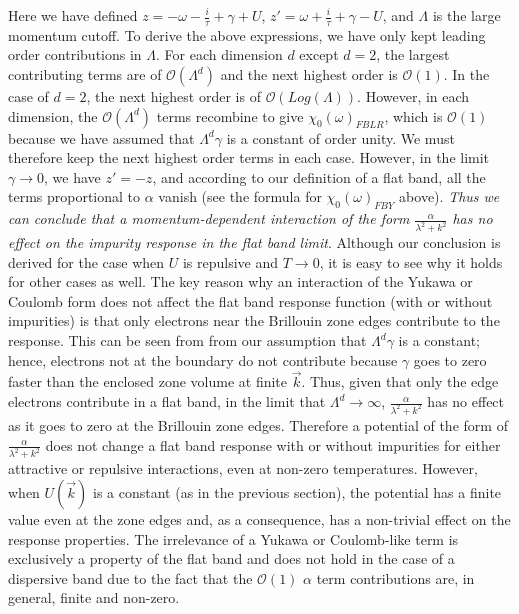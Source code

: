 \documentclass[prl,aps,twocolumn,groupaddress]{revtex4-1}
\begin{document}
Here we have defined $z = -\omega - \frac{i}{\tau} + \gamma + U$, $z' = \omega + \frac{i}{\tau} +\gamma - U$, and $\Lambda$ is the large momentum cutoff. To derive the above expressions, we have only kept leading order contributions in $\Lambda$. For each dimension $d$ except $d=2$, the largest contributing terms are of $\mathscr{O}(\Lambda^d)$ and the next highest order is $\mathscr{O}(1)$. In the case of $d=2$, the next highest order is of $\mathscr{O}(Log(\Lambda))$. However, in each dimension, the $\mathscr{O}(\Lambda^d)$ terms recombine to give $\chi_0(\omega)_{FBLR}$, which is $\mathscr{O}(1)$ because we have assumed that $\Lambda^d \gamma$ is a constant of order unity.  We must therefore keep the next highest order terms in each case. However, in the limit $\gamma \rightarrow 0$, we have $z' = -z$, and according to our definition of a flat band, all the terms proportional to $\alpha$ vanish (see the formula for $\chi_0(\omega)_{FBY}$ above). \textit{Thus we can conclude that a momentum-dependent interaction of the form $\frac{\alpha}{\lambda^2 + k^2}$ has no effect on the impurity response in the flat band limit}. Although our conclusion is derived for the case when $U$ is repulsive and $T\rightarrow0$, it is easy to see why it holds for other cases as well. The key reason why an interaction of the Yukawa or Coulomb form does not affect the flat band response function (with or without impurities) is that only electrons near the Brillouin zone edges contribute to the response. This can be seen from from our assumption that $\Lambda^d \gamma$ is a constant; hence, electrons not at the boundary do not contribute because $\gamma$ goes to zero faster than the enclosed zone volume at finite $\vec k$. Thus, given that only the edge electrons contribute in a flat band, in the limit that $\Lambda^d\rightarrow \infty$, $\frac{\alpha}{\lambda^2 + k^2}$ has no effect as it goes to zero at the Brillouin zone edges. Therefore a potential of the form of $\frac{\alpha}{\lambda^2 + k^2}$ does not change a flat band response with or without impurities for either attractive or repulsive interactions, even at non-zero temperatures. However, when $U(\vec k)$ is a constant (as in the previous section), the potential has a finite value even at the zone edges and, as a consequence, has a non-trivial effect on the response properties.  The irrelevance of a Yukawa or Coulomb-like term is exclusively a property of the flat band and does not hold in the case of a dispersive band due to the fact that the $\mathscr{O}(1)$ $\alpha$ term contributions are, in general, finite and non-zero. \\ \newline
\end{document}
